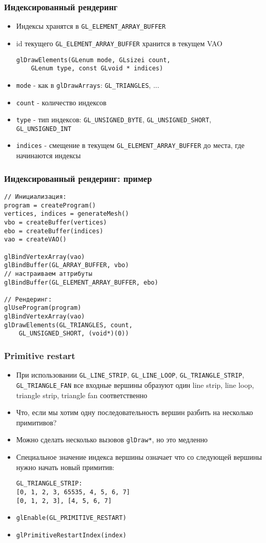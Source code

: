 \documentclass{beamer}
\begin{document}
\begin{frame}[fragile]
\frametitle{Индексированный рендеринг}
\begin{itemize}
\item Индексы хранятся в \verb|GL_ELEMENT_ARRAY_BUFFER|
\item id текущего \verb|GL_ELEMENT_ARRAY_BUFFER| хранится в текущем VAO
\pause
\begin{verbatim}
glDrawElements(GLenum mode, GLsizei count,
    GLenum type, const GLvoid * indices)
\end{verbatim}
\pause
\item \verb|mode| - как в \verb|glDrawArrays|: \verb|GL_TRIANGLES|, ...
\pause
\item \verb|count| - количество индексов
\pause
\item \verb|type| - тип индексов: \verb|GL_UNSIGNED_BYTE|, \verb|GL_UNSIGNED_SHORT|, \verb|GL_UNSIGNED_INT|
\pause
\item \verb|indices| - смещение в текущем \verb|GL_ELEMENT_ARRAY_BUFFER| до места, где начинаются индексы
\end{itemize}
\end{frame}

\begin{frame}[fragile]
\frametitle{Индексированный рендеринг: пример}
\fontsize{10pt}{10pt}
\begin{verbatim}
// Инициализация:
program = createProgram()
vertices, indices = generateMesh()
vbo = createBuffer(vertices)
ebo = createBuffer(indices)
vao = createVAO()

glBindVertexArray(vao)
glBindBuffer(GL_ARRAY_BUFFER, vbo)
// настраиваем аттрибуты
glBindBuffer(GL_ELEMENT_ARRAY_BUFFER, ebo)

// Рендеринг:
glUseProgram(program)
glBindVertexArray(vao)
glDrawElements(GL_TRIANGLES, count,
    GL_UNSIGNED_SHORT, (void*)(0))
\end{verbatim}
\end{frame}

\begin{frame}[fragile]
\frametitle{Primitive restart}
\begin{itemize}
\item При использовании \verb|GL_LINE_STRIP|, \verb|GL_LINE_LOOP|, \verb|GL_TRIANGLE_STRIP|, \verb|GL_TRIANGLE_FAN| все входные вершины образуют один line strip, line loop, triangle strip, triangle fan соответственно
\pause
\item Что, если мы хотим одну последовательность вершин разбить на несколько примитивов?
\pause
\item Можно сделать несколько вызовов \verb|glDraw*|, но это медленно
\pause
\item Специальное значение индекса вершины означает что со следующей вершины нужно начать новый примитив:
\begin{verbatim}
GL_TRIANGLE_STRIP:
[0, 1, 2, 3, 65535, 4, 5, 6, 7]
[0, 1, 2, 3], [4, 5, 6, 7]
\end{verbatim}
\pause
\item \verb|glEnable(GL_PRIMITIVE_RESTART)|
\pause
\item \verb|glPrimitiveRestartIndex(index)|
\end{itemize}
\end{frame}
\end{document}
